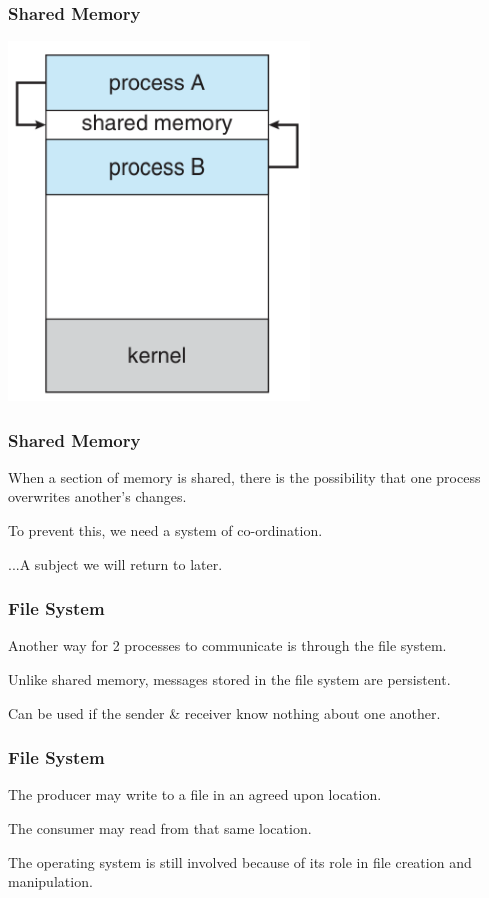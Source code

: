 \begin{frame}
\frametitle{Shared Memory}

\begin{center}
	\includegraphics[width=0.6\textwidth]{images/shared-memory.png}
\end{center}

\end{frame}

\begin{frame}
\frametitle{Shared Memory}

When a section of memory is shared, there is the possibility that one process overwrites another's changes.

To prevent this, we need a system of co-ordination.

...A subject we will return to later.

\end{frame}

\begin{frame}
\frametitle{File System}

Another way for 2 processes to communicate is through the file system.

Unlike shared memory, messages stored in the file system are persistent. 

Can be used if the sender \& receiver know nothing about one another.

\end{frame}

\begin{frame}
\frametitle{File System}

The producer may write to a file in an agreed upon location.

The consumer may read from that same location.

The operating system is still involved because of its role in file creation and manipulation.

\end{frame}

